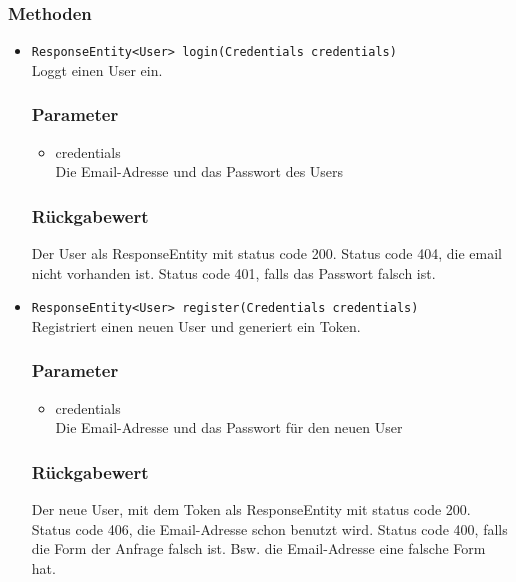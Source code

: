 \documentclass[a4paper]{scrreprt}
\begin{document}
\subsubsection*{Methoden}
\begin{addmargin}[25pt]{0pt}
\begin{itemize}

\item \texttt{ResponseEntity<User> login(Credentials credentials)}\\
	Loggt einen User ein.

	\subsubsection*{Parameter}
	\begin{itemize}
	\item credentials \\
		Die Email-Adresse und das Passwort des Users
	\end{itemize}

	\subsubsection*{Rückgabewert}
	Der User als ResponseEntity mit status code 200.
	Status code 404, die email nicht vorhanden ist.
	Status code 401, falls das Passwort falsch ist.

\item \texttt{ResponseEntity<User> register(Credentials credentials)}\\
	Registriert einen neuen User und generiert ein Token.

	\subsubsection*{Parameter}
	\begin{itemize}
	\item credentials \\
		Die Email-Adresse und das Passwort für den neuen User

	\end{itemize}

	\subsubsection*{Rückgabewert}
	Der neue User, mit dem Token als ResponseEntity mit status code 200.
	Status code 406, die Email-Adresse schon benutzt wird.
	Status code 400, falls die Form der Anfrage falsch ist. Bsw. die Email-Adresse eine falsche Form hat.
		

\end{itemize}
\end{addmargin}
\end{document}
